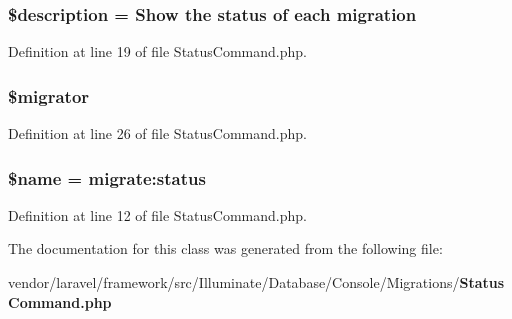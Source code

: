 \subsubsection[{\$description}]{\setlength{\rightskip}{0pt plus 5cm}\$description = \textquotesingle{}Show the status of {\bf each} migration\textquotesingle{}\hspace{0.3cm}{\ttfamily [protected]}}\label{class_illuminate_1_1_database_1_1_console_1_1_migrations_1_1_status_command_a87b032cba06009e3467abf1c8018d960}


Definition at line 19 of file Status\+Command.\+php.

\subsubsection[{\$migrator}]{\setlength{\rightskip}{0pt plus 5cm}\$migrator\hspace{0.3cm}{\ttfamily [protected]}}\label{class_illuminate_1_1_database_1_1_console_1_1_migrations_1_1_status_command_aec2ba48e5c793e0c168d4a5aaf932968}


Definition at line 26 of file Status\+Command.\+php.

\subsubsection[{\$name}]{\setlength{\rightskip}{0pt plus 5cm}\${\bf name} = \textquotesingle{}migrate\+:status\textquotesingle{}\hspace{0.3cm}{\ttfamily [protected]}}\label{class_illuminate_1_1_database_1_1_console_1_1_migrations_1_1_status_command_ab2fc40d43824ea3e1ce5d86dee0d763b}


Definition at line 12 of file Status\+Command.\+php.



The documentation for this class was generated from the following file\+:\begin{DoxyCompactItemize}
\item 
vendor/laravel/framework/src/\+Illuminate/\+Database/\+Console/\+Migrations/{\bf Status\+Command.\+php}\end{DoxyCompactItemize}
